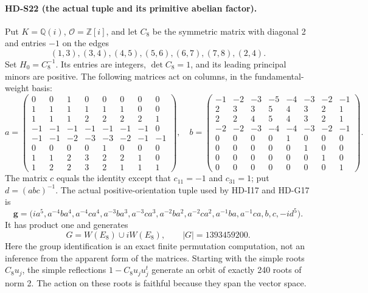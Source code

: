 \paragraph{HD-S22 (the actual tuple and its primitive abelian factor).}
Put \(K=\mathbb Q(i)\), \(\mathcal O=\mathbb Z[i]\), and let \(C_8\)
be the symmetric matrix with diagonal 2 and entries \(-1\) on the
edges
\[
 (1,3),(3,4),(4,5),(5,6),(6,7),(7,8),(2,4).
\]
Set \(H_0=C_8^{-1}\). Its entries are integers, \(\det C_8=1\),
and its leading principal minors are positive. The following matrices
act on columns, in the fundamental-weight basis:
\begingroup\small
\[
a=\begin{pmatrix}
0&0&1&0&0&0&0&0\\
1&1&1&1&1&1&0&0\\
1&1&1&2&2&2&2&1\\
-1&-1&-1&-1&-1&-1&-1&0\\
-1&-1&-2&-3&-3&-2&-1&-1\\
0&0&0&0&1&0&0&0\\
1&1&2&3&2&2&1&0\\
1&2&2&3&2&1&1&1
\end{pmatrix},\quad
b=\begin{pmatrix}
-1&-2&-3&-5&-4&-3&-2&-1\\
2&3&3&5&4&3&2&1\\
2&2&4&5&4&3&2&1\\
-2&-2&-3&-4&-4&-3&-2&-1\\
0&0&0&0&1&0&0&0\\
0&0&0&0&0&1&0&0\\
0&0&0&0&0&0&1&0\\
0&0&0&0&0&0&0&1
\end{pmatrix}.
\]
\endgroup
The matrix \(c\) equals the identity except that \(c_{11}=-1\)
and \(c_{31}=1\); put \(d=(abc)^{-1}\).
The actual positive-orientation tuple used by HD-I17 and HD-G17 is
\begin{equation}\label{eq:e8-actual-tuple}
 \boldsymbol g=
 \bigl(ia^5,
 a^{-4}ba^4,a^{-4}ca^4,
 a^{-3}ba^3,a^{-3}ca^3,
 a^{-2}ba^2,a^{-2}ca^2,
 a^{-1}ba,a^{-1}ca,b,c,-id^5\bigr).
\end{equation}
It has product one and generates
\[
 G=W(E_8)\cup iW(E_8),\qquad
 |G|=1393459200.
\]
Here the group identification is an exact finite permutation computation,
not an inference from the apparent form of the matrices. Starting with
the simple roots \(C_8u_j\), the simple reflections
\(1-C_8u_ju_j^t\) generate an orbit of exactly 240 roots of norm 2.
The action on these roots is faithful because they span the vector space.
